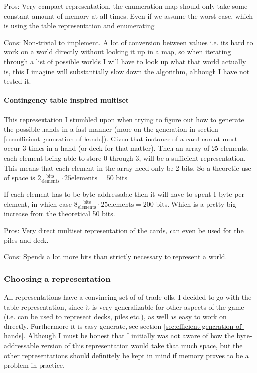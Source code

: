 Pros: Very compact representation, the enumeration map should only take some constant amount of memory at all times.
Even if we assume the worst case, which is using the table representation and enumerating

Cons: Non-trivial to implement.
A lot of conversion between values i.e. its hard to work on a world directly without looking it up in a map, so when iterating through a list of possible worlds I will have to look up what that world actually is, this I imagine will substantially slow down the algorithm, although I have not tested it.

\paragraph{Contingency table inspired multiset}
This representation I stumbled upon when trying to figure out how to generate the possible hands in a fast manner (more on the generation in section \ref{sec:efficient-generation-of-hands}).
Given that instance of a card can at most occur 3 times in a hand (or deck for that matter).
Then an array of 25 elements, each element being able to store 0 through 3, will be a sufficient representation.
This means that each element in the array need only be 2 bits.
So a theoretic use of space is $2 \frac{\text{bits}}{\text{elements}} \cdot 25\text{elements} = 50$ bits. 

If each element has to be byte-addressable then it will have to spent 1 byte per element, in which case $8 \frac{\text{bits}}{\text{elements}} \cdot 25\text{elements} = 200$ bits.
Which is a pretty big increase from the theoretical 50 bits.  

Pros: Very direct multiset representation of the cards, can even be used for the piles and deck. 

Cons: Spends a lot more bits than strictly necessary to represent a world.


\subsubsection{Choosing a representation}
All representations have a convincing set of of trade-offs.
I decided to go with the table representation, since it is very generalizable for other aspects of the game (i.e. can be used to represent decks, piles etc.), as well as easy to work on directly.
Furthermore it is easy generate, see section \ref{sec:efficient-generation-of-hands}.
Although I must be honest that I initially was not aware of how the byte-addressable version of this representation would take that much space, but the other representations should definitely be kept in mind if memory proves to be a problem in practice.


